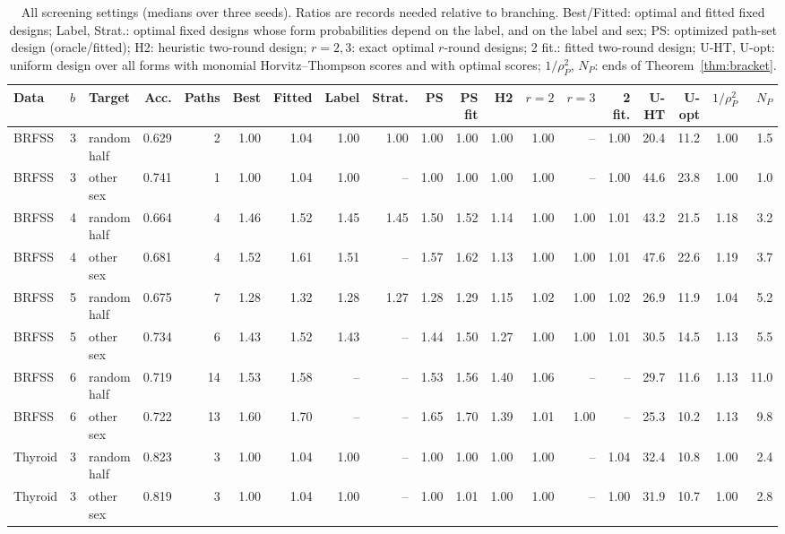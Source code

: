 \begin{table}[h]
\centering
\caption{All screening settings (medians over three seeds). Ratios are records needed relative to branching. Best/Fitted: optimal and fitted fixed designs; Label, Strat.: optimal fixed designs whose form probabilities depend on the label, and on the label and sex; PS: optimized path-set design (oracle/fitted); H2: heuristic two-round design; $r{=}2,3$: exact optimal $r$-round designs; 2 fit.: fitted two-round design; U-HT, U-opt: uniform design over all forms with monomial Horvitz--Thompson scores and with optimal scores; $1/\rho_P^2$, $N_P$: ends of Theorem~\ref{thm:bracket}.}
\label{tab:screeningdetail}
\scriptsize
\setlength{\tabcolsep}{2.0pt}
\begin{tabular}{lllrrrrrrrrrrrrrrrr}
\toprule
Data & $b$ & Target & Acc. & Paths & Best & Fitted & Label & Strat. & PS & PS fit & H2 & $r{=}2$ & $r{=}3$ & 2 fit. & U-HT & U-opt & $1/\rho_P^2$ & $N_P$ \\
\midrule
BRFSS & 3 & random half & 0.629 & 2 & 1.00 & 1.04 & 1.00 & 1.00 & 1.00 & 1.00 & 1.00 & 1.00 & -- & 1.00 & 20.4 & 11.2 & 1.00 & 1.5 \\
BRFSS & 3 & other sex & 0.741 & 1 & 1.00 & 1.04 & 1.00 & -- & 1.00 & 1.00 & 1.00 & 1.00 & -- & 1.00 & 44.6 & 23.8 & 1.00 & 1.0 \\
BRFSS & 4 & random half & 0.664 & 4 & 1.46 & 1.52 & 1.45 & 1.45 & 1.50 & 1.52 & 1.14 & 1.00 & 1.00 & 1.01 & 43.2 & 21.5 & 1.18 & 3.2 \\
BRFSS & 4 & other sex & 0.681 & 4 & 1.52 & 1.61 & 1.51 & -- & 1.57 & 1.62 & 1.13 & 1.00 & 1.00 & 1.01 & 47.6 & 22.6 & 1.19 & 3.7 \\
BRFSS & 5 & random half & 0.675 & 7 & 1.28 & 1.32 & 1.28 & 1.27 & 1.28 & 1.29 & 1.15 & 1.02 & 1.00 & 1.02 & 26.9 & 11.9 & 1.04 & 5.2 \\
BRFSS & 5 & other sex & 0.734 & 6 & 1.43 & 1.52 & 1.43 & -- & 1.44 & 1.50 & 1.27 & 1.00 & 1.00 & 1.01 & 30.5 & 14.5 & 1.13 & 5.5 \\
BRFSS & 6 & random half & 0.719 & 14 & 1.53 & 1.58 & -- & -- & 1.53 & 1.56 & 1.40 & 1.06 & -- & -- & 29.7 & 11.6 & 1.13 & 11.0 \\
BRFSS & 6 & other sex & 0.722 & 13 & 1.60 & 1.70 & -- & -- & 1.65 & 1.70 & 1.39 & 1.01 & 1.00 & -- & 25.3 & 10.2 & 1.13 & 9.8 \\
Thyroid & 3 & random half & 0.823 & 3 & 1.00 & 1.04 & 1.00 & -- & 1.00 & 1.00 & 1.00 & 1.00 & -- & 1.04 & 32.4 & 10.8 & 1.00 & 2.4 \\
Thyroid & 3 & other sex & 0.819 & 3 & 1.00 & 1.04 & 1.00 & -- & 1.00 & 1.01 & 1.00 & 1.00 & -- & 1.00 & 31.9 & 10.7 & 1.00 & 2.8 \\

\end{tabular}
\end{table}
